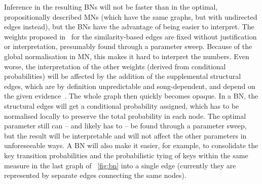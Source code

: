 \documentclass[letterpaper]{article} %
\newcommand{\figref}[1]{\figurename~\ref{fig:#1}} %
\begin{document}
Inference in the resulting BNs will not be faster than in the optimal, propositionally described MNs (which have the same graphs, but with undirected edges instead), but the BNs have the advantage of being easier to interpret. The weights proposed in~\cite{papadopoulos2017taslp} for the similarity-based edges are fixed without justification or interpretation, presumably found through a parameter sweep. Because of the global normalisation in MN, this makes it hard to interpret the numbers. Even worse, the interpretation of the other weights (derived from conditional probabilities) will be affected by the addition of the supplemental structural edges, which are by definition unpredictable and song-dependent, and depend on the given evidence~\cite{jain2011ki}. The whole graph then quickly becomes opaque. In a BN, the structural edges will get a conditional probability assigned, which has to be normalised locally to preserve the total probability in each node. The optimal parameter still can -- and likely has to -- be found through a parameter sweep, but the result will be interpretable and will not affect the other parameters in unforeseeable ways. A BN will also make it easier, for example, to consolidate the key transition probabilities and the probabilistic tying of keys within the same measure in the last graph of \figref{bn} into a single edge (currently they are represented by separate edges connecting the same nodes).



%
%


\end{document}
